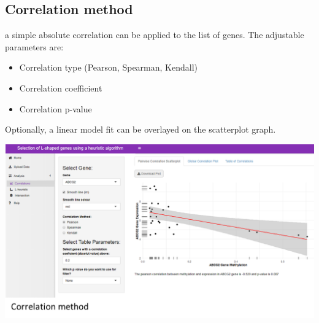 \subsection{Correlation method}
a simple absolute correlation can be applied to the list of genes. The adjustable parameters are:

\begin{itemize}
\item Correlation type (Pearson, Spearman, Kendall)
\item Correlation coefficient
\item Correlation p-value
\end{itemize}

Optionally, a linear model fit can be overlayed on the scatterplot graph.

\begin{center}
	\includegraphics[width=0.8\columnwidth]{./images/correlation_method.png}
\end{center}

